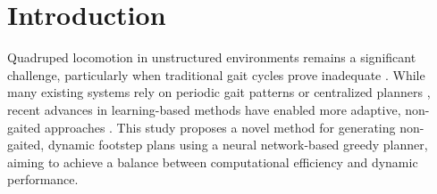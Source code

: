 \documentclass[../../main.tex]{subfiles}
\begin{document}
\chapter{Introduction}
\label{chap:introduction}

Quadruped locomotion in unstructured environments remains a
significant challenge, particularly when traditional gait cycles
prove inadequate \cite{Chai2022survey}. While many existing systems
rely on periodic gait patterns or centralized planners
\cite{Chai2022survey}, recent advances in learning-based methods have
enabled more adaptive, non-gaited approaches
\cite{Fan2024survey}. This study
proposes a novel method for generating non-gaited, dynamic footstep
plans using a neural network-based greedy planner, aiming to achieve
a balance between computational efficiency and dynamic performance.







\end{document}
